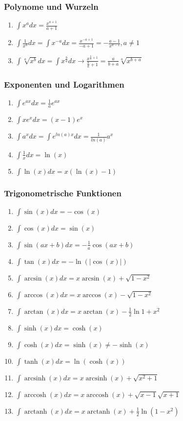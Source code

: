 \documentclass[a4paper, 9pt, DIV=24]{scrartcl}
\DeclareMathOperator{\arcsinh}{arcsinh}
\DeclareMathOperator{\arccosh}{arccosh}
\DeclareMathOperator{\arctanh}{arctanh}
\begin{document}
\subsubsection{Polynome und Wurzeln}
\begin{enumerate}[label={(}\arabic*{)}]
 \item $\int x^a dx = \frac{x^{a+1}}{a+1}$
 \item $\int \frac{1}{x^a} dx = \int x^{-a} dx = \frac{x^{-a+1}}{-a+1} = -\frac{a-1}{x^{a-1}}, a \neq 1$
 \item $\int \sqrt[a]{x^b} dx = \int x^{\frac{b}{a}} dx \rightarrow \frac{x^{\frac{b}{a}+1}}{\frac{b}{a}+1} = \frac{a}{b+a}\sqrt[a]{x^{b+a}}$
\end{enumerate}
\subsubsection{Exponenten und Logarithmen}
\begin{enumerate}[label={(}\arabic*{)}]
 \item $\int e^{ax} dx = \frac{1}{a}e^{ax}$
 \item $\int xe^{x} dx = (x-1)e^{x}$
 \item $\int a^{x} dx = \int e^{ln(a)x} dx = \frac{1}{ln(a)}a^x$
 \item $\int \frac{1}{x} dx = \ln(x)$
 \item $\int \ln(x) dx = x(\ln(x)-1)$
\end{enumerate}
\subsubsection{Trigonometrische Funktionen}
\begin{enumerate}[label={(}\arabic*{)}]
 \item $\int \sin(x) dx = -\cos(x)$
 \item $\int \cos(x) dx = \sin(x)$
 \item $\int \sin(ax+b) dx = -\frac{1}{a}\cos(ax+b)$
 \item $\int \tan(x) dx = -\ln(|\cos(x)|)$
 \item $\int \arcsin(x) dx = x\arcsin(x) + \sqrt{1-x^2}$
 \item $\int \arccos(x) dx = x\arccos(x) - \sqrt{1-x^2}$
 \item $\int \arctan(x) dx = x\arctan(x) - \frac{1}{2}\ln{1+x^2}$
 \item $\int \sinh(x) dx = \cosh(x)$
 \item $\int \cosh(x) dx = \sinh(x) \neq -\sinh(x)$
 \item $\int \tanh(x) dx = \ln(\cosh(x))$
 \item $\int \arcsinh(x) dx = x\arcsinh(x) + \sqrt{x^2+1}$
 \item $\int \arccosh(x) dx = x\arccosh(x) + \sqrt{x-1}\sqrt{x+1}$
 \item $\int \arctanh(x) dx = x\arctanh(x) + \frac{1}{2}\ln(1-x^2)$
\end{enumerate}
\end{document}
